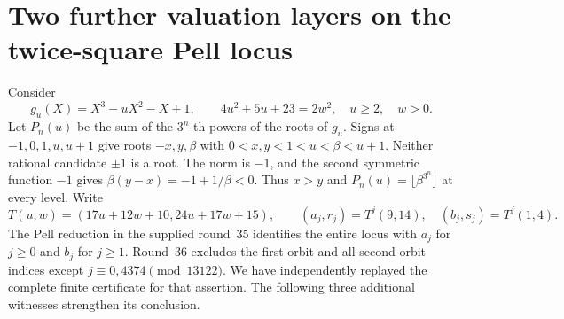 \documentclass[11pt,a4paper]{article}
\theoremstyle{remark}\newtheorem{remark}[theorem]{Remark}
\begin{document}
\section{Two further valuation layers on the twice-square Pell locus}
\label{sec:pell-new}
Consider
\[
 g_u(X)=X^3-uX^2-X+1,\qquad
 4u^2+5u+23=2w^2,\quad u\ge2,\quad w>0.
\]
Let $P_n(u)$ be the sum of the $3^n$-th powers of the roots of $g_u$.
Signs at $-1,0,1,u,u+1$ give roots $-x,y,\beta$ with
$0<x,y<1<u<\beta<u+1$. Neither rational candidate $\pm1$ is a root.
The norm is $-1$, and the second symmetric function $-1$ gives
$\beta(y-x)=-1+1/\beta<0$. Thus $x>y$ and
$P_n(u)=\lfloor\beta^{3^n}\rfloor$ at every level.
Write
\[
 T(u,w)=(17u+12w+10,24u+17w+15),\qquad
 (a_j,r_j)=T^j(9,14),\quad (b_j,s_j)=T^j(1,4).
\]
The Pell reduction in the supplied round~35 identifies the entire
locus with $a_j$ for $j\ge0$ and $b_j$ for $j\ge1$.
Round~36 excludes the first orbit and all second-orbit indices except
$j\equiv0,4374\pmod{13122}$. We have independently replayed the
complete finite certificate for that assertion. The following
three additional witnesses strengthen its conclusion.
\end{document}
